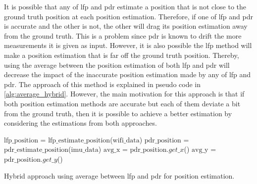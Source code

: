 It is possible that any of \gls{lfp} and \gls{pdr} estimate a position that is not close to the ground truth position at each position estimation. Therefore, if one of \gls{lfp} and \gls{pdr} is accurate and the other is not, the other will drag its position estimation away from the ground truth. This is a problem since \gls{pdr} is known to drift the more measurements it is given as input. However, it is also possible the \gls{lfp} method will make a position estimation that is far off the ground truth position.
Thereby, using the average between the position estimation of both \gls{lfp} and \gls{pdr} will decrease the impact of the inaccurate position estimation made by any of \gls{lfp} and \gls{pdr}. The approach of this method is explained in pseudo code in \autoref{alg:average_hybrid}.
However, the main motivation for this approach is that if both position estimation methods are accurate but each of them deviate a bit from the ground truth, then it is possible to achieve a better estimation by considering the estimations from both approaches.

\begin{algorithm}[H]
\SetAlgoLined
{}
 $\text{lfp\_position}$ = $\text{lfp\_estimate\_position}$($\text{wifi\_data}$)\;
 $\text{pdr\_position}$ = $\text{pdr\_estimate\_position}$($\text{imu\_data}$)\;
 $\text{avg\_x}$ = $\text{pdr\_position}.get\_x$()\;
 $\text{avg\_y}$ = $\text{pdr\_position}.get\_y$()\;
 
 \caption{Hybrid approach using average between \gls{lfp} and \gls{pdr} for position estimation.}
 \label{alg:average_hybrid}
\end{algorithm}

